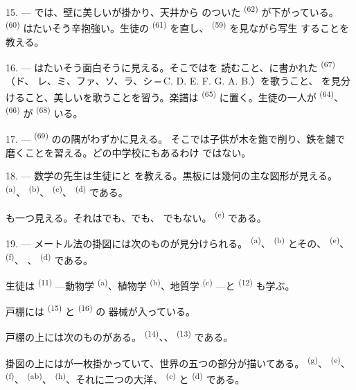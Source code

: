 15. --- では、壁に美しいが掛かり、天井から
のついた \textsuperscript{(62)} が下がっている。
 \textsuperscript{(60)} はたいそう辛抱強い。生徒の
\textsuperscript{(61)} を直し、 \textsuperscript{(59)} を見ながら写生
することを教える。

16. --- はたいそう面白そうに見える。そこではを
読むこと、に書かれた \textsuperscript{(67)} （ド、
レ、ミ、ファ、ソ、ラ、シ\,=\,C. D. E. F. G. A. B.）を歌うこと、
を見分けること、美しいを歌うことを習う。楽譜は
 \textsuperscript{(65)} に置く。生徒の一人が
\textsuperscript{(64)}、 \textsuperscript{(66)} が
 \textsuperscript{(68)} いる。

17. ---  \textsuperscript{(69)} のの隅がわずかに見える。
そこでは子供が木を鉋で削り、鉄を鑢で磨くことを習える。どの中学校にもあるわけ
ではない。

\VUsaut{5.0mm}
\VUsaut{3.6mm}

18. --- 数学の先生は生徒にと
を教える。黒板には幾何の主な図形が見える。
\textsuperscript{(a)}、 \textsuperscript{(b)}、
\textsuperscript{(c)}、 \textsuperscript{(d)} である。

も一つ見える。それはでも、でも、
でもない。 \textsuperscript{(e)} である。

19. --- メートル法の掛図には次のものが見分けられる。
\textsuperscript{(a)}、 \textsuperscript{(b)} とその、
 \textsuperscript{(e)}、 \textsuperscript{(f)}、
、 \textsuperscript{(d)} である。

生徒は \textsuperscript{(11)} ---動物学 \textsuperscript{(a)}、植物学
\textsuperscript{(b)}、地質学 \textsuperscript{(c)} ---と
\textsuperscript{(12)} も学ぶ。

戸棚には \textsuperscript{(15)} と \textsuperscript{(16)} の
器械が入っている。

戸棚の上には次のものがある。 \textsuperscript{(14)}、、
 \textsuperscript{(13)} である。

掛図の上にはが一枚掛かっていて、世界の五つの部分が描いてある。
 \textsuperscript{(g)}、 \textsuperscript{(e)}、
 \textsuperscript{(f)}、 \textsuperscript{(ab)}、
 \textsuperscript{(h)}、それに二つの大洋、
\textsuperscript{(c)} と \textsuperscript{(d)} である。
\VUsaut{6.0mm}
\VUfilet{22mm}
